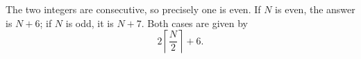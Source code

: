 The two integers are consecutive, so precisely one is even. If $N$ is even, the answer is $N+6$; if $N$ is odd, it is $N+7$. Both cases are given by
\[
\boxed{2\left\lceil\dfrac{N}{2}\right\rceil+6}.
\]

